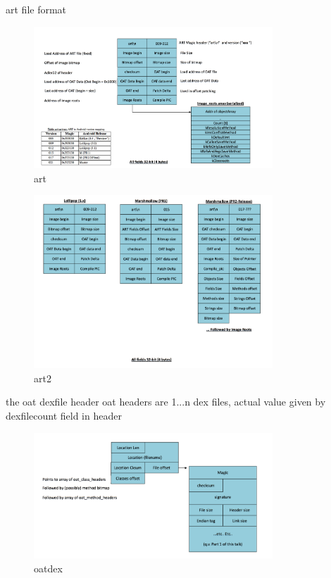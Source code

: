 art file format
\begin{figure}[h]
    \centering
    \includegraphics[width=0.8\textwidth]{data/art.png}
    \caption{art}
    \label{fig:art}
\end{figure}
\begin{figure}[h]
    \centering
    \includegraphics[width=0.8\textwidth]{data/art2.png}
    \caption{art2}
    \label{fig:art2}
\end{figure}


the oat dexfile header
oat headers are 1...n dex files, actual value given by dexfilecount field in header
\begin{figure}[h]
    \centering
    \includegraphics[width=0.8\textwidth]{data/oatdex.png}
    \caption{oatdex}
    \label{fig:awesome_image122223}
\end{figure}


